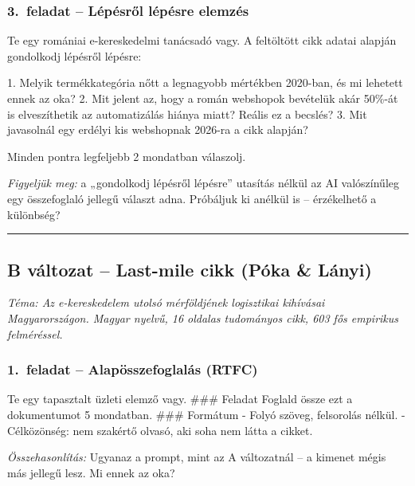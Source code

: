 \documentclass[11pt,a4paper]{article}
\begin{document}
\bigskip

\subsubsection*{3.\ feladat -- Lépésről lépésre elemzés}

\begin{prompt}
Te egy romániai e-kereskedelmi tanácsadó vagy.
A feltöltött cikk adatai alapján gondolkodj lépésről lépésre:

1. Melyik termékkategória nőtt a legnagyobb mértékben 2020-ban,
   és mi lehetett ennek az oka?
2. Mit jelent az, hogy a román webshopok bevételük akár 50\%-át
   is elveszíthetik az automatizálás hiánya miatt? Reális ez a becslés?
3. Mit javasolnál egy erdélyi kis webshopnak 2026-ra a cikk alapján?

Minden pontra legfeljebb 2 mondatban válaszolj.
\end{prompt}

\noindent\textit{Figyeljük meg:} a „gondolkodj lépésről lépésre”
utasítás nélkül az AI valószínűleg egy összefoglaló jellegű választ adna.
Próbáljuk ki anélkül is -- érzékelhető a különbség?

\bigskip\noindent\rule{\linewidth}{0.4pt}\bigskip

\subsection{B változat -- Last-mile cikk (Póka \& Lányi)}

\noindent\textit{Téma: Az e-kereskedelem utolsó mérföldjének logisztikai
kihívásai Magyarországon. Magyar nyelvű, 16 oldalas tudományos cikk,
603 fős empirikus felméréssel.}

\bigskip

\subsubsection*{1.\ feladat -- Alapösszefoglalás (RTFC)}

\begin{prompt}
Te egy tapasztalt üzleti elemző vagy.
### Feladat
Foglald össze ezt a dokumentumot 5 mondatban.
### Formátum
- Folyó szöveg, felsorolás nélkül.
- Célközönség: nem szakértő olvasó, aki soha nem látta a cikket.
\end{prompt}

\noindent\textit{Összehasonlítás:} Ugyanaz a prompt, mint az A
változatnál -- a kimenet mégis más jellegű lesz. Mi ennek az oka?
\end{document}
